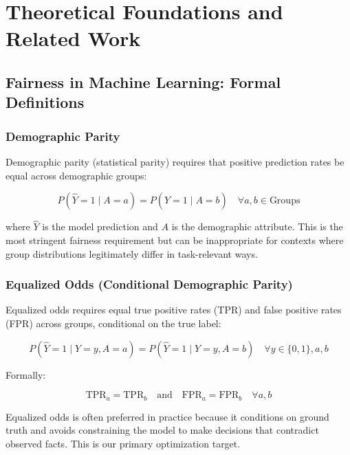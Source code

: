 \documentclass[11pt,a4paper,oneside]{report}
\begin{document}
\chapter{Theoretical Foundations and Related Work}

\section{Fairness in Machine Learning: Formal Definitions}

\subsection{Demographic Parity}

Demographic parity (statistical parity) requires that positive prediction rates be equal across demographic groups:

\begin{equation}
P(\hat{Y} = 1 \mid A = a) = P(\hat{Y} = 1 \mid A = b) \quad \forall a, b \in \text{Groups}
\end{equation}

where $\hat{Y}$ is the model prediction and $A$ is the demographic attribute. This is the most stringent fairness requirement but can be inappropriate for contexts where group distributions legitimately differ in task-relevant ways.

\subsection{Equalized Odds (Conditional Demographic Parity)}

Equalized odds requires equal true positive rates (TPR) and false positive rates (FPR) across groups, conditional on the true label:

\begin{equation}
P(\hat{Y} = 1 \mid Y = y, A = a) = P(\hat{Y} = 1 \mid Y = y, A = b) \quad \forall y \in \{0, 1\}, a, b
\end{equation}

Formally:

\begin{equation}
\text{TPR}_a = \text{TPR}_b \quad \text{and} \quad \text{FPR}_a = \text{FPR}_b \quad \forall a, b
\end{equation}

Equalized odds is often preferred in practice because it conditions on ground truth and avoids constraining the model to make decisions that contradict observed facts. This is our primary optimization target.
\end{document}
